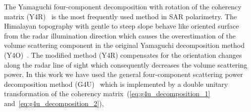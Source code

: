 The Yamaguchi four-component decomposition with rotation of the coherency matrix (Y4R)~\citep{YAMAGUCHI2011} is the most frequently used method in SAR polarimetry. The Himalayan topography with gentle to steep slope behave like oriented surface from the radar illumination direction which causes the overestimation of the volume scattering component in the original Yamaguchi decomposition method (Y4O)~\citep{Yamaguchi2005}. The modified method (Y4R) compensates for the orientation changes along the radar line of sight which consequently decreases the volume scattering power. In this work we have used the general four-component scattering power decomposition method (G4U)~\citep{singh13} which is implemented by a double unitary transformation of the coherency matrix~(\ref{eq:g4u_decomposition_1} and~\ref{eq:g4u_decomposition_2}), 

